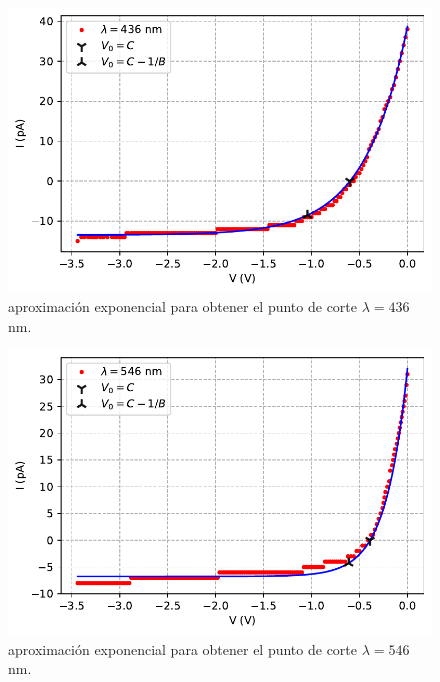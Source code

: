 \documentclass[12pt,a4paper]{article}
\numberwithin{equation}{section}
\numberwithin{table}{section}
\numberwithin{figure}{section}
\begin{document}
\begin{figure}[h!]  \centering
\includegraphics[scale=0.97]{Datos_exponencial_3.pdf}
\caption{aproximación exponencial para obtener el punto de corte $\lambda=436$ nm.}
\label{Fig:6.2.3}
\end{figure}

\newpage
\begin{figure}[h!]  \centering
\includegraphics[scale=0.97]{Datos_exponencial_4.pdf}
\caption{aproximación exponencial para obtener el punto de corte $\lambda=546$ nm.}
\label{Fig:6.2.4}
\end{figure}
\end{document}
